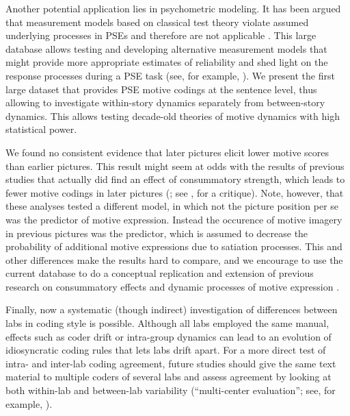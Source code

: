 \documentclass[man,a4paper,mask]{apa6}\usepackage[]{graphicx}\usepackage[]{color}
\begin{document}
Another potential application lies in psychometric modeling. It has been argued that measurement models based on classical test theory violate assumed underlying processes in PSEs and therefore are not applicable \parencite{atkinson_studying_1981,hibbard_critique_2003,schultheiss_reliability_2008}. This large database allows testing and developing alternative measurement models that might provide more appropriate estimates of reliability and shed light on the response processes during a PSE task (see, for example, ). We present the first large dataset that provides PSE motive codings at the sentence level, thus allowing to investigate within-story dynamics separately from between-story dynamics. This allows testing decade-old theories of motive dynamics with high statistical power. 

We found no consistent evidence that later pictures elicit lower motive scores than earlier pictures. This result might seem at odds with the results of previous studies that actually did find an effect of consummatory strength, which leads to fewer motive codings in later pictures (; see , for a critique). Note, however, that these analyses tested a different model, in which not the picture position per se was the predictor of motive expression. Instead the occurence of motive imagery in previous pictures was the predictor, which is assumed to decrease the probability of additional motive expressions due to satiation processes. This and other differences make the results hard to compare, and we encourage to use the current database to do a conceptual replication and extension of previous research on consummatory effects and dynamic processes of motive expression \parencite{atkinson_dynamics_1970}.

Finally, now a systematic (though indirect) investigation of differences between labs in coding style is possible. 
Although all labs employed the same manual, effects such as coder drift \parencite{schultheiss_MeasuringImplicitMotives_2007} or intra-group dynamics \parencite{jenkins_HandbookClinicalScoring_2008} can lead to an evolution of idiosyncratic coding rules that lets labs drift apart.
For a more direct test of intra- and inter-lab coding agreement, future studies should give the same text material to multiple coders of several labs and assess agreement by looking at both within-lab and between-lab variability (``multi-center evaluation''; see, for example, ).
\end{document}
